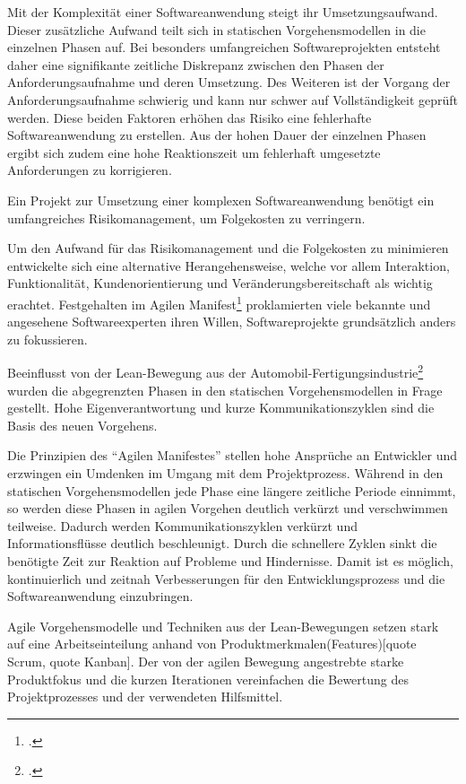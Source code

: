 Mit der Komplexität einer Softwareanwendung steigt ihr Umsetzungsaufwand. Dieser zusätzliche Aufwand teilt sich in statischen Vorgehensmodellen in die einzelnen Phasen auf. Bei besonders umfangreichen Softwareprojekten entsteht daher eine signifikante zeitliche Diskrepanz zwischen den Phasen der Anforderungsaufnahme und deren Umsetzung. Des Weiteren ist der Vorgang der Anforderungsaufnahme schwierig und kann nur schwer auf Vollständigkeit geprüft werden. Diese beiden Faktoren erhöhen das Risiko eine fehlerhafte Softwareanwendung zu erstellen. Aus der hohen Dauer der einzelnen Phasen ergibt sich zudem eine hohe Reaktionszeit um fehlerhaft umgesetzte Anforderungen zu korrigieren.

Ein Projekt zur Umsetzung einer komplexen Softwareanwendung benötigt ein umfangreiches Risikomanagement, um Folgekosten 
zu verringern.

Um den Aufwand für das Risikomanagement und die Folgekosten zu minimieren entwickelte sich eine alternative
Herangehensweise, welche vor allem Interaktion, Funktionalität, Kundenorientierung und Veränderungsbereitschaft als
wichtig erachtet. Festgehalten im Agilen Manifest\footcite[vgl.][]{agile-manifest} proklamierten viele bekannte und angesehene
Softwareexperten ihren Willen, Softwareprojekte grundsätzlich anders zu fokussieren.

Beeinflusst von der Lean-Bewegung aus der Automobil-Fertigungsindustrie\footcite[vgl.][]{kent1999} wurden die abgegrenzten Phasen 
in den statischen Vorgehensmodellen in Frage gestellt. Hohe Eigenverantwortung und kurze Kommunikationszyklen sind die 
Basis des neuen Vorgehens.

Die Prinzipien des ``Agilen Manifestes'' stellen hohe Ansprüche an Entwickler und erzwingen ein Umdenken im Umgang mit dem Projektprozess. Während in den statischen Vorgehensmodellen jede Phase eine längere zeitliche Periode einnimmt, so werden diese Phasen in agilen Vorgehen deutlich verkürzt und verschwimmen teilweise. Dadurch werden Kommunikationszyklen verkürzt und Informationsflüsse deutlich beschleunigt.
Durch die schnellere Zyklen sinkt die benötigte Zeit zur Reaktion auf Probleme und Hindernisse. Damit ist es möglich, kontinuierlich und zeitnah Verbesserungen für den Entwicklungsprozess und die Softwareanwendung einzubringen. 

Agile Vorgehensmodelle und Techniken aus der Lean-Bewegungen setzen stark auf eine Arbeitseinteilung anhand von Produktmerkmalen(Features)[quote Scrum, quote Kanban]. Der von der agilen Bewegung angestrebte starke Produktfokus und die kurzen Iterationen vereinfachen die Bewertung des Projektprozesses und der verwendeten Hilfsmittel.

